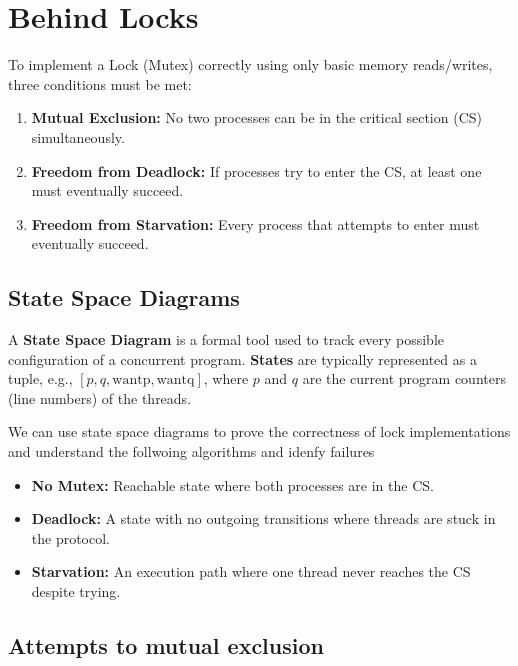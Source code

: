 \section{Behind Locks}

To implement a Lock (Mutex) correctly using only basic memory reads/writes, three conditions must be met:
\begin{enumerate}
    \item \textbf{Mutual Exclusion:} No two processes can be in the critical section (CS) simultaneously.
    \item \textbf{Freedom from Deadlock:} If processes try to enter the CS, at least one must eventually succeed.
    \item \textbf{Freedom from Starvation:} Every process that attempts to enter must eventually succeed.
\end{enumerate}

\subsection{State Space Diagrams}

\begin{definition}
    A \textbf{State Space Diagram} is a formal tool used to track every possible configuration of a concurrent program.
    \textbf{States} are typically represented as a tuple, e.g., $[p, q, \text{wantp}, \text{wantq}]$, where $p$ and $q$ are the current program counters (line numbers) of the threads.
\end{definition}

\begin{remark}
    We can use state space diagrams to prove the correctness of lock implementations and understand the follwoing algorithms and idenfy failures
    \begin{itemize}
        \item \textbf{No Mutex:} Reachable state where both processes are in the CS.
        \item \textbf{Deadlock:} A state with no outgoing transitions where threads are stuck in the protocol.
        \item \textbf{Starvation:} An execution path where one thread never reaches the CS despite trying.
    \end{itemize}
\end{remark}

\subsection{Attempts to mutual exclusion}


